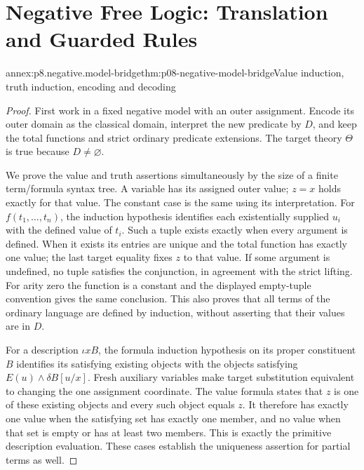 \section{Negative Free Logic: Translation and Guarded Rules}
\label{sec:annex-p08-negative-free-logic-calculus}

\begin{annexitem}{annex:p8.negative.model-bridge}{thm:p08-negative-model-bridge}{Value induction, truth induction, encoding and decoding}
\begin{proof}
First work in a fixed negative model with an outer assignment.  Encode its
outer domain as the classical domain, interpret the new predicate by \(D\),
and keep the total functions and strict ordinary predicate extensions.
The target theory \(\Theta\) is true because \(D\ne\varnothing\).

We prove the value and truth assertions simultaneously by the size of a
finite term/formula syntax tree.  A variable has its assigned outer value;
\(z=x\) holds exactly for that value.  The constant case is the same using
its interpretation.  For \(f(t_1,\ldots,t_n)\), the induction hypothesis
identifies each existentially supplied \(u_i\) with the defined value of
\(t_i\).  Such a tuple exists exactly when every argument is defined.
When it exists its entries are unique and the total function has exactly
one value; the last target equality fixes \(z\) to that value.  If some
argument is undefined, no tuple satisfies the conjunction, in agreement
with the strict lifting.  For arity zero the function is a constant and
the displayed empty-tuple convention gives the same conclusion.  This
also proves that all terms of the ordinary language are defined by
induction, without asserting that their values are in \(D\).

For a description \(\iota xB\), the formula induction hypothesis on its
proper constituent \(B\) identifies its satisfying existing objects with
the objects satisfying \(E(u)\land\delta B[u/x]\).  Fresh auxiliary
variables make target substitution equivalent to changing the one
assignment coordinate.  The value formula states that \(z\) is one of
these existing objects and every such object equals \(z\).  It therefore
has exactly one value when the satisfying set has exactly one member,
and no value when that set is empty or has at least two members.  This
is exactly the primitive description evaluation.  These cases establish
the uniqueness assertion for partial terms as well.


\end{proof}
\end{annexitem}
